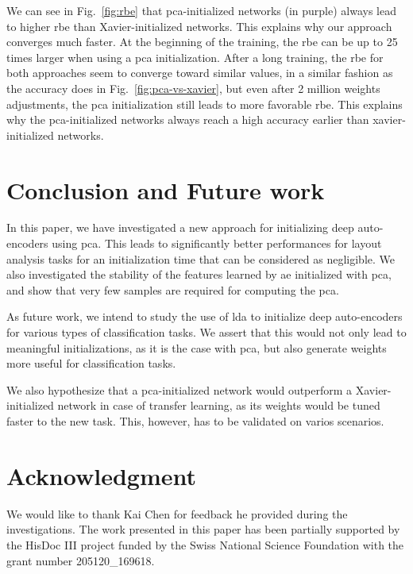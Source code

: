 \documentclass[conference]{IEEEtran}
\begin{document}
We can see in Fig.~\ref{fig:rbe} that \ac{pca}-initialized networks (in purple) always lead to higher \ac{rbe} than Xavier-initialized networks.
This explains why our approach converges much faster.
At the beginning of the training, the \ac{rbe} can be up to 25 times larger when using a \ac{pca} initialization.
After a long training, the \ac{rbe} for both approaches seem to converge toward similar values, in a similar fashion as the accuracy does in Fig.~\ref{fig:pca-vs-xavier}, but even after 2 million weights adjustments, the \ac{pca} initialization still leads to more favorable \ac{rbe}.
This explains why the \ac{pca}-initialized networks always reach a high accuracy earlier than xavier-initialized networks.





\section{Conclusion and Future work}\label{sct:conclusion}
In this paper, we have investigated a new approach for initializing deep auto-encoders using \ac{pca}.
This leads to significantly better performances for layout analysis tasks for an initialization time that can be considered as negligible.
We also investigated the stability of the features learned by \ac{ae} initialized with \ac{pca}, and show that very few samples are required for computing the \ac{pca}.

As future work, we intend to study the use of \ac{lda} to initialize deep auto-encoders for various types of classification tasks.
We assert that this would not only lead to meaningful initializations, as it is the case with \ac{pca}, but also generate weights more useful for classification tasks.

We also hypothesize that a \ac{pca}-initialized network would outperform a Xavier-initialized network in case of transfer learning, as its weights would be tuned faster to the new task. This, however, has to be validated on varios scenarios.



\section*{Acknowledgment}
We would like to thank Kai Chen for feedback he provided during the investigations.
The work presented in this paper has been partially supported by the HisDoc III project funded by the Swiss National Science Foundation with the grant number 205120\_169618.



\end{document}
